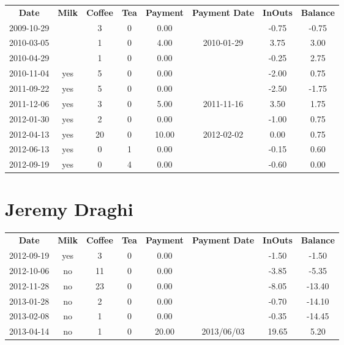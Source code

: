 \begin{center}
\begin{tabular}{cccccccc}
\textbf{Date} & \textbf{Milk} & \textbf{Coffee} & \textbf{Tea} & \textbf{Payment} & \textbf{Payment Date} & \textbf{InOuts} & \textbf{Balance} \\
2009-10-29 &  &  3 & 0 &  0.00 &  & -0.75 & -0.75\\ 
2010-03-05 &  &  1 & 0 &  4.00 & 2010-01-29 &  3.75 &  3.00\\ 
2010-04-29 &  &  1 & 0 &  0.00 &  & -0.25 &  2.75\\ 
2010-11-04 & yes &  5 & 0 &  0.00 &  & -2.00 &  0.75\\ 
2011-09-22 & yes &  5 & 0 &  0.00 &  & -2.50 & -1.75\\ 
2011-12-06 & yes &  3 & 0 &  5.00 & 2011-11-16 &  3.50 &  1.75\\ 
2012-01-30 & yes &  2 & 0 &  0.00 &  & -1.00 &  0.75\\ 
2012-04-13 & yes & 20 & 0 & 10.00 & 2012-02-02 &  0.00 &  0.75\\ 
2012-06-13 & yes &  0 & 1 &  0.00 &  & -0.15 &  0.60\\ 
2012-09-19 & yes &  0 & 4 &  0.00 &  & -0.60 &  0.00
\end{tabular}
\end{center}

\section{Jeremy Draghi}

\begin{center}
\begin{tabular}{cccccccc}
\textbf{Date} & \textbf{Milk} & \textbf{Coffee} & \textbf{Tea} & \textbf{Payment} & \textbf{Payment Date} & \textbf{InOuts} & \textbf{Balance} \\
2012-09-19 & yes &  3 & 0 &  0.00 &  & -1.50 &  -1.50\\ 
2012-10-06 & no & 11 & 0 &  0.00 &  & -3.85 &  -5.35\\ 
2012-11-28 & no & 23 & 0 &  0.00 &  & -8.05 & -13.40\\ 
2013-01-28 & no &  2 & 0 &  0.00 &  & -0.70 & -14.10\\ 
2013-02-08 & no &  1 & 0 &  0.00 &  & -0.35 & -14.45\\ 
2013-04-14 & no &  1 & 0 & 20.00 & 2013/06/03 & 19.65 &   5.20
\end{tabular}
\end{center}

